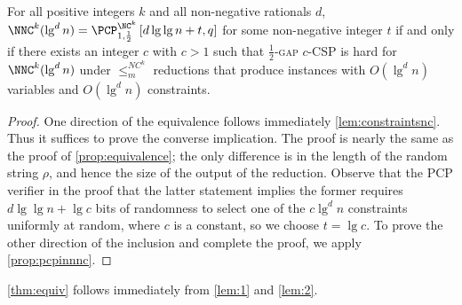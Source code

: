 \documentclass[]{article}
\newcommand{\PCPcs}[5]{\PCP^{#1}_{#2, #3}\left[#4, #5\right]}
\begin{document}
\begin{lemma}\label{lem:2}
  For all positive integers $k$ and all non-negative rationals $d$, $\NNC^k(\lg^d n) = \PCPcs{\NC^k}{1}{\frac{1}{2}}{d \lg \lg n + t}{q}$ for some non-negative integer $t$ if and only if there exists an integer $c$ with $c > 1$ such that \textsc{$\frac{1}{2}$-gap $c$-CSP} is hard for $\NNC^k(\lg^d n)$ under $\leq_m^{NC^k}$ reductions that produce instances with $O(\lg^d n)$ variables and $O(\lg^d n)$ constraints.
\end{lemma}
\begin{proof}
  One direction of the equivalence follows immediately \autoref{lem:constraintsnc}.
  Thus it suffices to prove the converse implication.
  The proof is nearly the same as the proof of \autoref{prop:equivalence}; the only difference is in the length of the random string $\rho$, and hence the size of the output of the reduction.
  Observe that the PCP verifier in the proof that the latter statement implies the former requires $d \lg \lg n + \lg c$ bits of randomness to select one of the $c \lg^d n$ constraints uniformly at random, where $c$ is a constant, so we choose $t = \lg c$.
  To prove the other direction of the inclusion and complete the proof, we apply \autoref{prop:pcpinnnc}.
\end{proof}

\autoref{thm:equiv} follows immediately from \autoref{lem:1} and \autoref{lem:2}.



\end{document}
